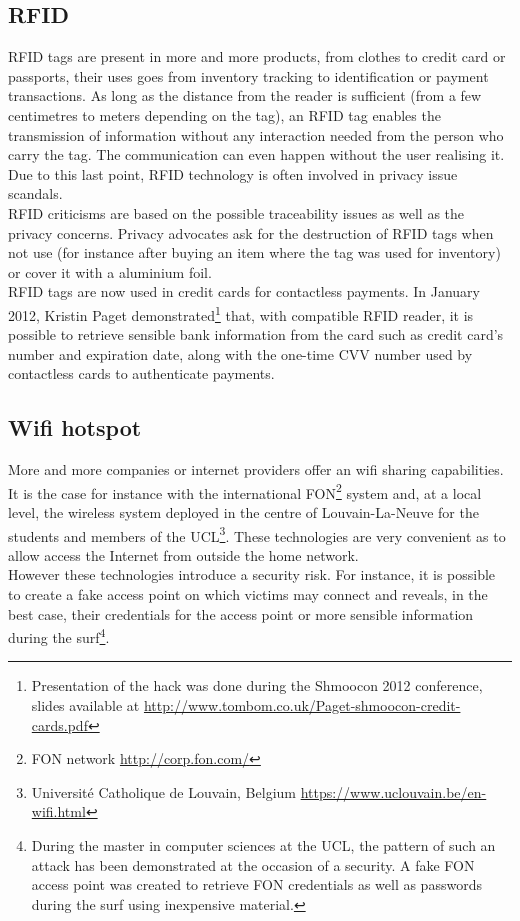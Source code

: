 \subsection{RFID}

RFID tags are present in more and more products, from clothes to credit card or passports, their uses goes from inventory tracking to identification or payment transactions.
As long as the distance from the reader is sufficient (from a few centimetres to meters depending on the tag), an RFID tag enables the transmission of information without any interaction needed from the person who carry the tag.
The communication can even happen without the user realising it.
Due to this last point, RFID technology is often involved in privacy issue scandals.\\

RFID criticisms are based on the possible traceability issues as well as the privacy concerns.
Privacy advocates ask for the destruction of RFID tags when not use (for instance after buying an item where the tag was used for inventory) or cover it with a aluminium foil.\\

RFID tags are now used in credit cards for contactless payments.
In January 2012, Kristin Paget demonstrated\footnote{Presentation of the hack was done during the Shmoocon 2012 conference, slides available at \url{http://www.tombom.co.uk/Paget-shmoocon-credit-cards.pdf}} that, with compatible RFID reader, it is possible to retrieve sensible bank information from the card such as credit card's number and expiration date, along with the one-time CVV number used by contactless cards to authenticate payments.

\subsection{Wifi hotspot}

More and more companies or internet providers offer an wifi sharing capabilities.
It is the case for instance with the international FON\footnote{FON network \url{http://corp.fon.com/}} system and, at a local level, the wireless system deployed in the centre of Louvain-La-Neuve for the students and members of the UCL\footnote{Université Catholique de Louvain, Belgium \url{https://www.uclouvain.be/en-wifi.html}}.
These technologies are very convenient as to allow access the Internet from outside the home network.\\

However these technologies introduce a security risk.
For instance, it is possible to create a fake access point on which victims may connect and reveals, in the best case, their credentials for the access point or more sensible information during the surf\footnote{During the master in computer sciences at the UCL, the pattern of such an attack has been demonstrated at the occasion of a security. A fake FON access point was created to retrieve FON credentials as well as passwords during the surf using inexpensive material.}.

